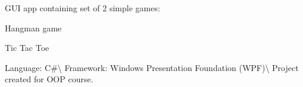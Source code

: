 G\+UI app containing set of 2 simple games\+:
\begin{DoxyItemize}
\item Hangman game
\item Tic Tac Toe
\end{DoxyItemize}

Language\+: C\#\textbackslash{} Framework\+: Windows Presentation Foundation (W\+PF)\textbackslash{} Project created for O\+OP course. 